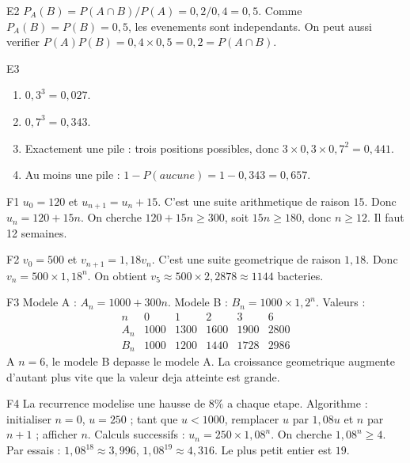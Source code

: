 \documentclass[11pt,a4paper]{article}
\begin{document}
\begin{corrige}{E2}
$P_A(B)=P(A\cap B)/P(A)=0,2/0,4=0,5$. Comme $P_A(B)=P(B)=0,5$, les evenements sont independants. On peut aussi verifier $P(A)P(B)=0,4\times0,5=0,2=P(A\cap B)$.
\end{corrige}

\begin{corrige}{E3}
\begin{enumerate}
    \item $0,3^3=0,027$.
    \item $0,7^3=0,343$.
    \item Exactement une pile : trois positions possibles, donc $3\times0,3\times0,7^2=0,441$.
    \item Au moins une pile : $1-P(aucune)=1-0,343=0,657$.
\end{enumerate}
\end{corrige}

\begin{corrige}{F1}
$u_0=120$ et $u_{n+1}=u_n+15$. C'est une suite arithmetique de raison $15$. Donc $u_n=120+15n$. On cherche $120+15n\geq300$, soit $15n\geq180$, donc $n\geq12$. Il faut 12 semaines.
\end{corrige}

\begin{corrige}{F2}
$v_0=500$ et $v_{n+1}=1,18v_n$. C'est une suite geometrique de raison $1,18$. Donc $v_n=500\times1,18^n$. On obtient $v_5\approx500\times2,2878\approx1144$ bacteries.
\end{corrige}

\begin{corrige}{F3}
Modele A : $A_n=1000+300n$. Modele B : $B_n=1000\times1,2^n$. Valeurs :
\[
\begin{array}{c|ccccc}
n&0&1&2&3&6\\ \hline
A_n&1000&1300&1600&1900&2800\\
B_n&1000&1200&1440&1728&2986
\end{array}
\]
A $n=6$, le modele B depasse le modele A. La croissance geometrique augmente d'autant plus vite que la valeur deja atteinte est grande.
\end{corrige}

\begin{corrige}{F4}
La recurrence modelise une hausse de $8\%$ a chaque etape. Algorithme : initialiser $n=0$, $u=250$ ; tant que $u<1000$, remplacer $u$ par $1,08u$ et $n$ par $n+1$ ; afficher $n$. Calculs successifs : $u_n=250\times1,08^n$. On cherche $1,08^n\geq4$. Par essais : $1,08^{18}\approx3,996$, $1,08^{19}\approx4,316$. Le plus petit entier est $19$.
\end{corrige}
\end{document}
